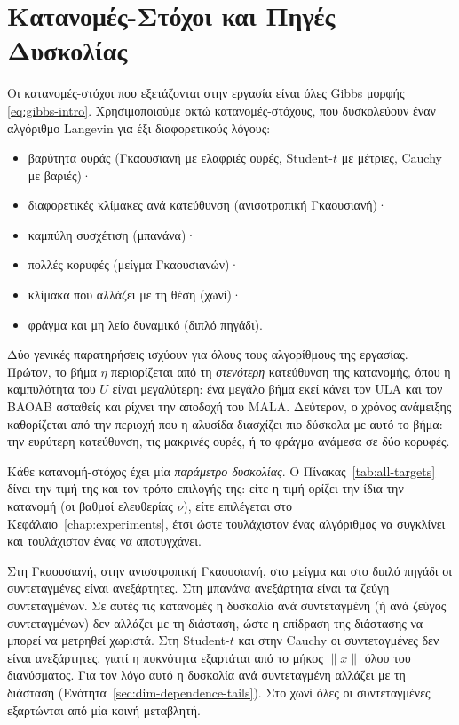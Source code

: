 \section{Κατανομές-Στόχοι και Πηγές Δυσκολίας}
\label{sec:bg-gibbs}

Οι κατανομές-στόχοι που εξετάζονται στην εργασία είναι όλες Gibbs μορφής
\eqref{eq:gibbs-intro}. Χρησιμοποιούμε οκτώ κατανομές-στόχους, που δυσκολεύουν
έναν αλγόριθμο Langevin για έξι διαφορετικούς λόγους:
\begin{itemize}
  \item βαρύτητα ουράς (Γκαουσιανή με ελαφριές ουρές, Student-$t$ με μέτριες, Cauchy με
        βαριές)·
  \item διαφορετικές κλίμακες ανά κατεύθυνση (ανισοτροπική Γκαουσιανή)·
  \item καμπύλη συσχέτιση (μπανάνα)·
  \item πολλές κορυφές (μείγμα Γκαουσιανών)·
  \item κλίμακα που αλλάζει με τη θέση (χωνί)·
  \item φράγμα και μη λείο δυναμικό (διπλό πηγάδι).
\end{itemize}

Δύο γενικές παρατηρήσεις ισχύουν για όλους τους αλγορίθμους της εργασίας. Πρώτον,
το βήμα $\eta$ περιορίζεται από τη \emph{στενότερη} κατεύθυνση της κατανομής, όπου
η καμπυλότητα του $U$ είναι μεγαλύτερη: ένα μεγάλο βήμα εκεί κάνει τον ULA και
τον BAOAB ασταθείς και ρίχνει την αποδοχή του MALA. Δεύτερον, ο χρόνος ανάμειξης
καθορίζεται από την περιοχή που η αλυσίδα διασχίζει πιο δύσκολα με αυτό το βήμα:
την ευρύτερη κατεύθυνση, τις μακρινές ουρές, ή το φράγμα ανάμεσα σε δύο κορυφές.

Κάθε κατανομή-στόχος έχει μία \emph{παράμετρο δυσκολίας}. Ο
Πίνακας~\ref{tab:all-targets} δίνει την τιμή της και τον τρόπο επιλογής της: είτε η
τιμή ορίζει την ίδια την κατανομή (οι βαθμοί ελευθερίας $\nu$), είτε επιλέγεται στο
Κεφάλαιο~\ref{chap:experiments}, έτσι ώστε τουλάχιστον ένας αλγόριθμος να
συγκλίνει και τουλάχιστον ένας να αποτυγχάνει.

Στη Γκαουσιανή, στην ανισοτροπική
Γκαουσιανή, στο μείγμα και στο διπλό πηγάδι οι συντεταγμένες είναι ανεξάρτητες. Στη
μπανάνα ανεξάρτητα είναι τα ζεύγη συντεταγμένων. Σε αυτές τις κατανομές η δυσκολία ανά συντεταγμένη (ή ανά ζεύγος συντεταγμένων) δεν αλλάζει
με τη διάσταση, ώστε η επίδραση της διάστασης να μπορεί να μετρηθεί χωριστά. Στη
Student-$t$ και στην Cauchy οι συντεταγμένες δεν είναι ανεξάρτητες, γιατί η
πυκνότητα εξαρτάται από το μήκος $\|x\|$ όλου του διανύσματος. Για τον λόγο αυτό η δυσκολία
ανά συντεταγμένη αλλάζει με τη διάσταση (Ενότητα~\ref{sec:dim-dependence-tails}). Στο
χωνί όλες οι συντεταγμένες εξαρτώνται από μία κοινή μεταβλητή.

